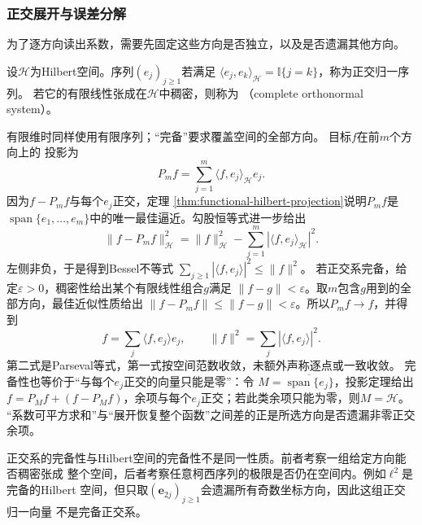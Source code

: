 \subsubsection{正交展开与误差分解}

为了逐方向读出系数，需要先固定这些方向是否独立，以及是否遗漏其他方向。
\begin{definition}[正交归一序列与完备正交系]
\label{def:functional-complete-orthonormal-system}
设$\mathcal H$为Hilbert空间。序列$(e_j)_{j\geq1}$若满足
$\langle e_j,e_k\rangle_{\mathcal H}=\mathbb I\{j=k\}$，称为正交归一序列。
若它的有限线性张成在$\mathcal H$中稠密，则称为
（complete orthonormal system）。
\end{definition}
有限维时同样使用有限序列；“完备”要求覆盖空间的全部方向。
目标$f$在前$m$个方向上的
投影为
\begin{equation}
  P_m f
  =
  \sum_{j=1}^{m}
  \langle f,e_j\rangle_{\mathcal{H}}e_j.
  \label{eq:functional-orthogonal-partial-projection}
\end{equation}
因为$f-P_mf$与每个$e_j$正交，定理
\ref{thm:functional-hilbert-projection}说明$P_mf$是
$\operatorname{span}\{e_1,\ldots,e_m\}$中的唯一最佳逼近。勾股恒等式进一步给出
\begin{equation}
  \lVert f-P_mf\rVert_{\mathcal{H}}^2
  =
  \lVert f\rVert_{\mathcal{H}}^2
  -
  \sum_{j=1}^{m}
  |\langle f,e_j\rangle_{\mathcal{H}}|^2.
  \label{eq:functional-projection-error-decomposition}
\end{equation}
左侧非负，于是得到Bessel不等式
$\sum_{j\geq1}|\langle f,e_j\rangle|^2\leq\lVert f\rVert^2$。
若正交系完备，给定$\varepsilon>0$，稠密性给出某个有限线性组合$g$满足
$\lVert f-g\rVert<\varepsilon$。取$m$包含$g$用到的全部方向，最佳近似性质给出
$\lVert f-P_mf\rVert\leq\lVert f-g\rVert<\varepsilon$。所以$P_mf\to f$，并得到
\[
 f=\sum_j\langle f,e_j\rangle e_j,\qquad
 \lVert f\rVert^2=\sum_j|\langle f,e_j\rangle|^2.
\]
第二式是Parseval等式，第一式按空间范数收敛，未额外声称逐点或一致收敛。
完备性也等价于“与每个$e_j$正交的向量只能是零”：令
$M=\overline{\operatorname{span}\{e_j\}}$，投影定理给出
$f=P_Mf+(f-P_Mf)$，余项与每个$e_j$正交；若此类余项只能为零，则$M=\mathcal H$。
“系数可平方求和”与“展开恢复整个函数”之间差的正是所选方向是否遗漏非零正交余项。

正交系的完备性与Hilbert空间的完备性不是同一性质。前者考察一组给定方向能否稠密张成
整个空间，后者考察任意柯西序列的极限是否仍在空间内。例如$\ell^2$是完备的Hilbert
空间，但只取$(\bm{e}_{2j})_{j\geq1}$会遗漏所有奇数坐标方向，因此这组正交归一向量
不是完备正交系。

